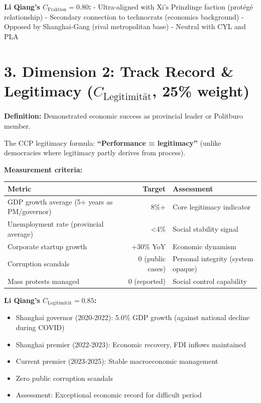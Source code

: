 \documentclass[11pt]{article}
\begin{document}
\textbf{Li Qiang's $C_{\text{Fraktion}} = 0.80$:}
- Ultra-aligned with Xi's Prinzlinge faction (protégé relationship)
- Secondary connection to technocrats (economics background)
- Opposed by Shanghai-Gang (rival metropolitan base)
- Neutral with CYL and PLA

\section{3. Dimension 2: Track Record \& Legitimacy ($C_{\text{Legitimität}}$, 25\% weight)}

\textbf{Definition:} Demonstrated economic success as provincial leader or Politburo member.

The CCP legitimacy formula: \textbf{``Performance = legitimacy''} (unlike democracies where legitimacy partly derives from process).

\textbf{Measurement criteria:}

\begin{table}[h]
\centering
\begin{tabular}{|l|r|l|}
\hline
\textbf{Metric} & \textbf{Target} & \textbf{Assessment} \\
\hline
GDP growth average (5+ years as PM/governor) & 8\%+ & Core legitimacy indicator \\
Unemployment rate (provincial average) & <4\% & Social stability signal \\
Corporate startup growth & +30\% YoY & Economic dynamism \\
Corruption scandals & 0 (public cases) & Personal integrity (system opaque) \\
Mass protests managed & 0 (reported) & Social control capability \\
\hline
\end{tabular}
\end{table}

\textbf{Li Qiang's $C_{\text{Legitimität}} = 0.85$:}
\begin{itemize}
\item Shanghai governor (2020-2022): 5.0\% GDP growth (against national decline during COVID)
\item Shanghai premier (2022-2023): Economic recovery, FDI inflows maintained
\item Current premier (2023-2025): Stable macroeconomic management
\item Zero public corruption scandals
\item Assessment: Exceptional economic record for difficult period
\end{itemize}
\end{document}
